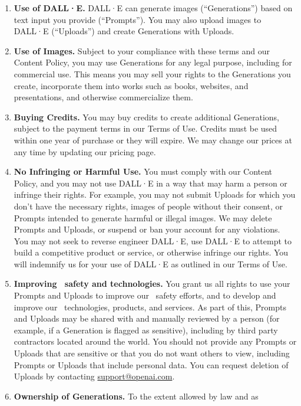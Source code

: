 \begin{enumerate}
\item \textbf{Use of DALL·E.} DALL·E can generate images (``Generations'') based
    on text input you provide (``Prompts''). You may also upload images to
    DALL·E (``Uploads'') and create Generations with Uploads.
\item \textbf{Use of Images.} Subject to your compliance with these terms and
    our Content Policy, you may use Generations for any legal purpose, including
    for commercial use. This means you may sell your rights to the Generations
    you create, incorporate them into works such as books, websites, and
    presentations, and otherwise commercialize them.
\item \textbf{Buying Credits.} You may buy credits to create additional
    Generations, subject to the payment terms in our Terms of Use. Credits must
    be used within one year of purchase or they will expire. We may change our
    prices at any time by updating our pricing page.
\item \textbf{No Infringing or Harmful Use.} You must comply with our Content
    Policy, and you may not use DALL·E in a way that may harm a person or
    infringe their rights. For example, you may not submit Uploads for which you
    don't have the necessary rights, images of people without their consent, or
    Prompts intended to generate harmful or illegal images. We may delete
    Prompts and Uploads, or suspend or ban your account for any violations. You
    may not seek to reverse engineer DALL·E, use DALL·E to attempt to build a
    competitive product or service, or otherwise infringe our rights. You will
    indemnify us for your use of DALL·E as outlined in our Terms of Use.
\item \textbf{Improving \AI\ safety and technologies.} You grant us all rights
    to use your Prompts and Uploads to improve our \AI\ safety efforts, and to
    develop and improve our \AI\ technologies, products, and services. As part
    of this, Prompts and Uploads may be shared with and manually reviewed by a
    person (for example, if a Generation is flagged as sensitive), including by
    third party contractors located around the world. You should not provide any
    Prompts or Uploads that are sensitive or that you do not want others to
    view, including Prompts or Uploads that include personal data. You can
    request deletion of Uploads by contacting \url{support@openai.com}.
\item \textbf{Ownership of Generations.} To the extent allowed by law and as

\end{enumerate}
